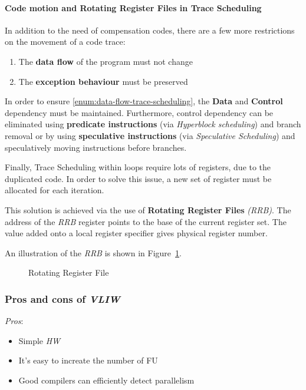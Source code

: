\documentclass[english]{article}
\begin{document}
\paragraph{Code motion and Rotating Register Files in Trace Scheduling}

In addition to the need of compensation codes, there are a few more restrictions on the movement of a code trace:

\begin{enumerate}[label=\Alph*)]
  \item \label{enum:data-flow-trace-scheduling} The \textbf{data flow} of the program must not change
  \item \label{enum:exception-behaviour-trace-scheduling} The \textbf{exception behaviour} must be preserved
\end{enumerate}

\bigskip

In order to ensure \ref{enum:data-flow-trace-scheduling}, the \textbf{Data} and \textbf{Control} dependency must be maintained.
Furthermore, control dependency can be eliminated using \textbf{predicate instructions} (via \textit{Hyperblock scheduling}) and branch removal or by using \textbf{speculative instructions} (via \textit{Speculative Scheduling}) and speculatively moving instructions before branches.

Finally, Trace Scheduling within loops require lots of registers, due to the duplicated code.
In order to solve this issue, a new set of register must be allocated for each iteration.

This solution is achieved via the use of \textbf{Rotating Register Files} \textit{(RRB)}.
The address of the \textit{RRB} register points to the base of the current register set.
The value added onto a local register specifier gives physical register number.

\bigskip
An illustration of the \textit{RRB} is shown in Figure~\ref{fig:rotating-register-file}.

\begin{figure}[htbp]
  \bigskip
  \centering
  \caption{Rotating Register File}
  \label{fig:rotating-register-file}
  \bigskip
\end{figure}

\subsubsection{Pros and cons of \textit{VLIW}}

\textit{Pros}:
\begin{itemize}
  \item Simple \textit{HW}
  \item It's easy to increate the number of FU
  \item Good compilers can efficiently detect parallelism
\end{itemize}
\end{document}
